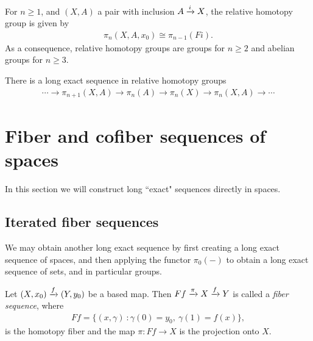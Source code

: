 \documentclass{article}[11pt]
\begin{document}
\begin{exercise} For $n\geq 1$, and $(X,A)$ a pair with inclusion $A\xrightarrow{i} X$, the relative homotopy group is given by
\begin{align*}
	\pi_n(X,A,x_0) \cong \pi_{n-1}(Fi).
\end{align*}
As a consequence, relative homotopy groups are groups for $n\geq 2$ and abelian groups for $n\geq 3$.
\end{exercise}

\begin{corollary} There is a long exact sequence in relative homotopy groups
\begin{align*}
	\cdots \to \pi_{n+1}(X,A) \to \pi_n(A) \to \pi_n(X) \to \pi_n(X,A) \to \cdots
\end{align*}
\end{corollary}


\section{Fiber and cofiber sequences of spaces}
In this section we will construct  long ``exact" sequences directly in spaces. 

\subsection{Iterated fiber sequences}
We may obtain another long exact sequence by first creating a long exact sequence of spaces, and then applying the functor $\pi_0(-)$ to obtain a long exact sequence of sets, and in particular groups.


\begin{definition} Let $(X,x_0) \xrightarrow{f} (Y,y_0)$ be a based map. Then $Ff\xrightarrow{\pi} X \xrightarrow{f} Y$ is called a \textit{fiber sequence}, where
\begin{align*}
	Ff = \{(x,\gamma) \ : \gamma(0) = y_0,\ \gamma(1) = f(x)\},
\end{align*}
is the homotopy fiber and the map $\pi\colon Ff \to X$ is the projection onto $X$.
\end{definition}
\end{document}
